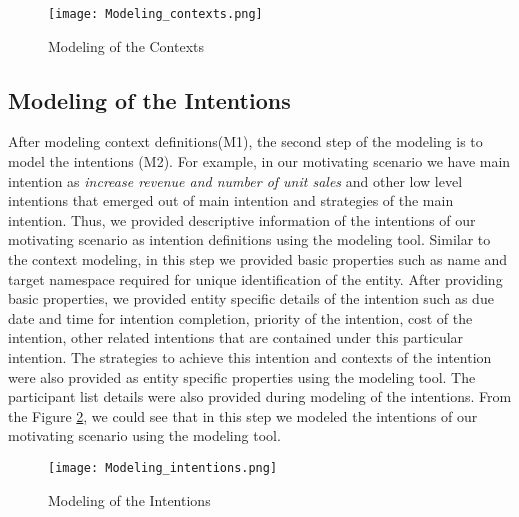 \begin{figure} [H]
	\centering
	\texttt{[image: Modeling\_contexts.png]}
	\caption{Modeling of the Contexts}
	\label{fig:modeling_contexts}
\end{figure}

\subsection{Modeling of the Intentions}
After modeling context definitions(M1), the second step of the modeling is to model the intentions (M2). For example, in our motivating scenario we have main intention as \textit{increase revenue and number of unit sales} and other low level intentions that emerged out of main intention and strategies of the main intention. Thus, we provided descriptive information of the intentions of our motivating scenario as intention definitions using the modeling tool. Similar to the context modeling, in this step we provided basic properties such as name and target namespace required for unique identification of the entity. After providing basic properties, we provided entity specific details of the intention such as due date and time for intention completion, priority of the intention, cost of the intention, other related intentions that are contained under this particular intention. The strategies to achieve this intention and contexts of the intention were also provided as entity specific properties using the modeling tool. The participant list details were also provided during modeling of the intentions. From the Figure \ref{fig:modeling_intentions}, we could see that in this step we modeled the intentions of our motivating scenario using the modeling tool. 

\begin{figure} [H]
	\centering
	\texttt{[image: Modeling\_intentions.png]}
	\caption{Modeling of the Intentions}
	\label{fig:modeling_intentions}
\end{figure}

